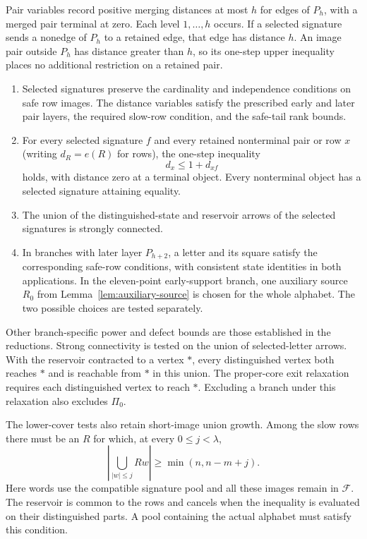 \documentclass[11pt]{article}
\theoremstyle{definition}
\theoremstyle{plain}
\begin{document}
Pair variables record positive merging distances at most $h$ for
edges of $P_h$, with a merged pair terminal at zero. Each level
$1,\ldots,h$ occurs. If a selected signature sends a nonedge of $P_h$
to a retained edge, that edge has distance $h$. An image pair outside
$P_h$ has distance greater than $h$, so its one-step upper inequality
places no additional restriction on a retained pair.
\begin{enumerate}
\item Selected signatures preserve the cardinality and independence
conditions on safe row images. The distance variables satisfy the
prescribed early and later pair layers, the required slow-row condition,
and the safe-tail rank bounds.
\item For every selected signature $f$ and every retained nonterminal
pair or row $x$ (writing $d_R=e(R)$ for rows), the one-step inequality
\[
 d_x\le 1+d_{xf}
\]
holds, with distance zero at a terminal object. Every nonterminal object
has a selected signature attaining equality.
\item The union of the distinguished-state and reservoir arrows of the selected
signatures is strongly connected.
\item In branches with later layer $P_{h+2}$, a letter and its square
satisfy the corresponding safe-row conditions, with consistent state
identities in both applications. In the eleven-point early-support
branch, one auxiliary source $R_0$ from
Lemma~\ref{lem:auxiliary-source} is chosen for the whole alphabet.
The two possible choices are tested separately.
\end{enumerate}
Other branch-specific power and defect bounds are those established in
the reductions. Strong connectivity is tested on the union of selected-letter arrows.
With the reservoir contracted to a vertex $*$, every distinguished vertex
both reaches $*$ and is reachable from $*$ in this union. The proper-core
exit relaxation requires each distinguished vertex to reach $*$.
Excluding a branch under this relaxation also excludes $\Pi_0$.

The lower-cover tests also retain short-image union growth. Among the
slow rows there must be an $R$ for which, at every $0\le j<\lambda$,
\[
 \left|\bigcup_{|w|\le j}Rw\right|
 \ge \min(n,n-m+j).
\]
Here words use the compatible signature pool and all these images remain
in $\mathcal F$. The reservoir is common to the rows and cancels when
the inequality is evaluated on their distinguished parts. A pool
containing the actual alphabet must satisfy this condition.
\end{document}
